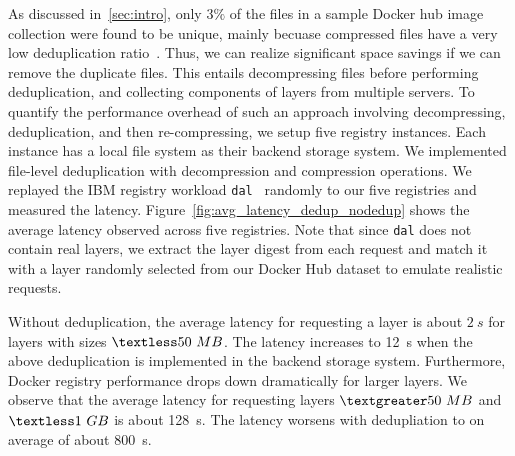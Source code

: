 As discussed in~\cref{sec:intro}, only $3\%$ of the files in a sample Docker hub image collection were found to be unique, mainly becuase 
 compressed files have a very low deduplication ratio~\cite{meister2012study}.
Thus, 
we can realize significant space savings if we can remove the 
duplicate files. This entails decompressing files before performing deduplication, and collecting components of layers from multiple servers.
%
To quantify the performance overhead of such an approach involving decompressing, deduplication, and then re-compressing,
we setup five registry instances. Each instance has a local file system as their backend storage system. We
implemented file-level deduplication with decompression and compression operations.
We replayed the IBM registry workload \texttt{dal}~\cite{dockerworkload} 
randomly to our five registries and measured the latency. 
%
Figure~\ref{fig:avg_latency_dedup_nodedup} shows the average latency observed 
across five registries.
Note that since 
\texttt{dal} does not contain real layers,
we extract the layer digest from each request and match it with a layer randomly selected from our Docker Hub dataset to emulate realistic requests.

Without deduplication,
the average latency for requesting a layer is about $2~s$ for layers with sizes $\textless50~MB$.
The latency increases to 12~s when the above deduplication is implemented in the backend storage system.
Furthermore, Docker registry performance drops down dramatically for larger layers.
We observe that the average latency for requesting layers $\textgreater50~MB$ and $\textless1~GB$
is about 128~s. The latency worsens with dedupliation to on average of about 800~s.


